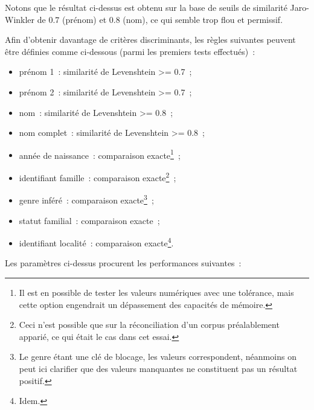 \documentclass[a4paper,12pt,twoside]{book}
\begin{document}
	            Notons que le résultat ci-dessus est obtenu sur la base de seuils de similarité Jaro-Winkler de 0.7 (prénom) et 0.8 (nom), ce qui semble trop flou et permissif.
                \pagebreak
                
	            Afin d'obtenir davantage de critères discriminants, les règles suivantes peuvent être définies comme ci-dessous (parmi les premiers tests effectués)~:
	            
	            \begin{itemize}
	            \vspace{0.8em}
	                \item prénom 1~: similarité de Levenshtein >= 0.7~;
	                \item prénom 2~: similarité de Levenshtein >= 0.7~;
	                \item nom~: similarité de Levenshtein >= 0.8~;
	                \item nom complet~: similarité de Levenshtein >= 0.8~;
	                \item année de naissance~: comparaison exacte\footnote{Il est en possible de tester les valeurs numériques avec une tolérance, mais cette option engendrait un dépassement des capacités de mémoire.}~;
	                \item identifiant famille~: comparaison exacte\footnote{Ceci n'est possible que sur la réconciliation d'un corpus préalablement apparié, ce qui était le cas dans cet essai.}~;
	                \item genre inféré~: comparaison exacte\footnote{Le genre étant une clé de blocage, les valeurs correspondent, néanmoins on peut ici clarifier que des valeurs manquantes ne constituent pas un résultat positif.}~;
	                \item statut familial~: comparaison exacte~;
	                \item identifiant localité~: comparaison exacte\footnote{Idem.}.
	            \end{itemize}
	            \vspace{0.8em}
	            Les paramètres ci-dessus procurent les performances suivantes~:
	            
\end{document}
